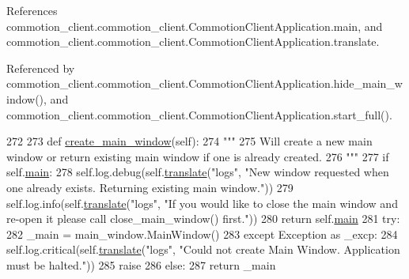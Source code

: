 References commotion\-\_\-client.\-commotion\-\_\-client.\-Commotion\-Client\-Application.\-main, and commotion\-\_\-client.\-commotion\-\_\-client.\-Commotion\-Client\-Application.\-translate.



Referenced by commotion\-\_\-client.\-commotion\-\_\-client.\-Commotion\-Client\-Application.\-hide\-\_\-main\-\_\-window(), and commotion\-\_\-client.\-commotion\-\_\-client.\-Commotion\-Client\-Application.\-start\-\_\-full().


\begin{DoxyCode}
272 
273     \textcolor{keyword}{def }\hyperlink{classcommotion__client_1_1commotion__client_1_1CommotionClientApplication_a726949d610a2bd566d1f3745b74c7b42}{create\_main\_window}(self):
274         \textcolor{stringliteral}{"""}
275 \textcolor{stringliteral}{        Will create a new main window or return existing main window if one is already created.}
276 \textcolor{stringliteral}{        """}
277         \textcolor{keywordflow}{if} self.\hyperlink{classcommotion__client_1_1commotion__client_1_1CommotionClientApplication_a4ae692cf60dc0a935cf2e8a72f657d1a}{main}:
278             self.log.debug(self.\hyperlink{classcommotion__client_1_1commotion__client_1_1CommotionClientApplication_a57e951c9b241fb0e0c70055b4ca1b6f7}{translate}(\textcolor{stringliteral}{"logs"}, \textcolor{stringliteral}{"New window requested when one already exists.
       Returning existing main window."}))
279             self.log.info(self.\hyperlink{classcommotion__client_1_1commotion__client_1_1CommotionClientApplication_a57e951c9b241fb0e0c70055b4ca1b6f7}{translate}(\textcolor{stringliteral}{"logs"}, \textcolor{stringliteral}{"If you would like to close the main window and
       re-open it please call close\_main\_window() first."}))
280             \textcolor{keywordflow}{return} self.\hyperlink{classcommotion__client_1_1commotion__client_1_1CommotionClientApplication_a4ae692cf60dc0a935cf2e8a72f657d1a}{main}
281         \textcolor{keywordflow}{try}:
282             \_main = main\_window.MainWindow()
283         \textcolor{keywordflow}{except} Exception \textcolor{keyword}{as} \_excp:
284             self.log.critical(self.\hyperlink{classcommotion__client_1_1commotion__client_1_1CommotionClientApplication_a57e951c9b241fb0e0c70055b4ca1b6f7}{translate}(\textcolor{stringliteral}{"logs"}, \textcolor{stringliteral}{"Could not create Main Window. Application
       must be halted."}))
285             \textcolor{keywordflow}{raise}
286         \textcolor{keywordflow}{else}:
287             \textcolor{keywordflow}{return} \_main

\end{DoxyCode}
